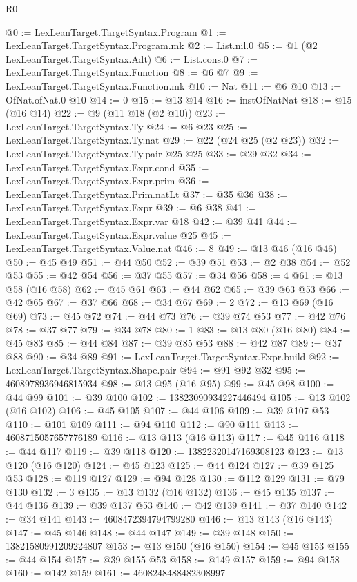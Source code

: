 \begin{lexlean}{R0}
\begin{coremodule}
@0 := LexLeanTarget.TargetSyntax.Program
@1 := LexLeanTarget.TargetSyntax.Program.mk
@2 := List.nil.{0}
@5 := @1 (@2 LexLeanTarget.TargetSyntax.Adt)
@6 := List.cons.{0}
@7 := LexLeanTarget.TargetSyntax.Function
@8 := @6 @7
@9 := LexLeanTarget.TargetSyntax.Function.mk
@10 := Nat
@11 := @6 @10
@13 := OfNat.ofNat.{0} @10
@14 := 0
@15 := @13 @14
@16 := instOfNatNat
@18 := @15 (@16 @14)
@22 := @9 (@11 @18 (@2 @10))
@23 := LexLeanTarget.TargetSyntax.Ty
@24 := @6 @23
@25 := LexLeanTarget.TargetSyntax.Ty.nat
@29 := @22 (@24 @25 (@2 @23))
@32 := LexLeanTarget.TargetSyntax.Ty.pair @25 @25
@33 := @29 @32
@34 := LexLeanTarget.TargetSyntax.Expr.cond
@35 := LexLeanTarget.TargetSyntax.Expr.prim
@36 := LexLeanTarget.TargetSyntax.Prim.natLt
@37 := @35 @36
@38 := LexLeanTarget.TargetSyntax.Expr
@39 := @6 @38
@41 := LexLeanTarget.TargetSyntax.Expr.var @18
@42 := @39 @41
@44 := LexLeanTarget.TargetSyntax.Expr.value @25
@45 := LexLeanTarget.TargetSyntax.Value.nat
@46 := 8
@49 := @13 @46 (@16 @46)
@50 := @45 @49
@51 := @44 @50
@52 := @39 @51
@53 := @2 @38
@54 := @52 @53
@55 := @42 @54
@56 := @37 @55
@57 := @34 @56
@58 := 4
@61 := @13 @58 (@16 @58)
@62 := @45 @61
@63 := @44 @62
@65 := @39 @63 @53
@66 := @42 @65
@67 := @37 @66
@68 := @34 @67
@69 := 2
@72 := @13 @69 (@16 @69)
@73 := @45 @72
@74 := @44 @73
@76 := @39 @74 @53
@77 := @42 @76
@78 := @37 @77
@79 := @34 @78
@80 := 1
@83 := @13 @80 (@16 @80)
@84 := @45 @83
@85 := @44 @84
@87 := @39 @85 @53
@88 := @42 @87
@89 := @37 @88
@90 := @34 @89
@91 := LexLeanTarget.TargetSyntax.Expr.build
@92 := LexLeanTarget.TargetSyntax.Shape.pair
@94 := @91 @92 @32
@95 := 4608978936946815934
@98 := @13 @95 (@16 @95)
@99 := @45 @98
@100 := @44 @99
@101 := @39 @100
@102 := 13823090934227446494
@105 := @13 @102 (@16 @102)
@106 := @45 @105
@107 := @44 @106
@109 := @39 @107 @53
@110 := @101 @109
@111 := @94 @110
@112 := @90 @111
@113 := 4608715057657776189
@116 := @13 @113 (@16 @113)
@117 := @45 @116
@118 := @44 @117
@119 := @39 @118
@120 := 13822320147169308123
@123 := @13 @120 (@16 @120)
@124 := @45 @123
@125 := @44 @124
@127 := @39 @125 @53
@128 := @119 @127
@129 := @94 @128
@130 := @112 @129
@131 := @79 @130
@132 := 3
@135 := @13 @132 (@16 @132)
@136 := @45 @135
@137 := @44 @136
@139 := @39 @137 @53
@140 := @42 @139
@141 := @37 @140
@142 := @34 @141
@143 := 4608472394794799280
@146 := @13 @143 (@16 @143)
@147 := @45 @146
@148 := @44 @147
@149 := @39 @148
@150 := 13821580991209224807
@153 := @13 @150 (@16 @150)
@154 := @45 @153
@155 := @44 @154
@157 := @39 @155 @53
@158 := @149 @157
@159 := @94 @158
@160 := @142 @159
@161 := 4608248488482308997

\end{coremodule}
\end{lexlean}
